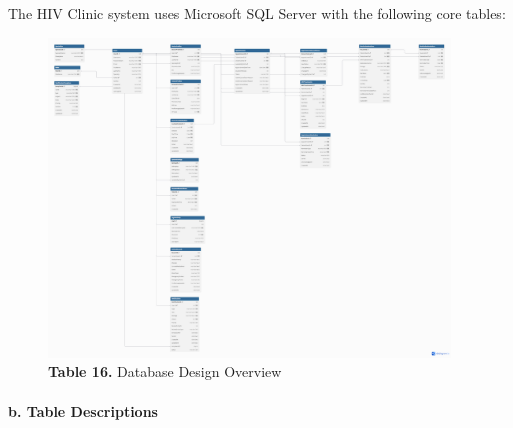 \documentclass[12pt,a4paper]{article}
\begin{document}
The HIV Clinic system uses Microsoft SQL Server with the following core tables:

\begin{figure}[H]
    \centering
    \includegraphics[width=0.95\textwidth]{diagrams/Picture/Database.png}
    \caption*{\textbf{Table 16.} Database Design Overview}
\end{figure}



\paragraph{b. Table Descriptions}
\end{document}
